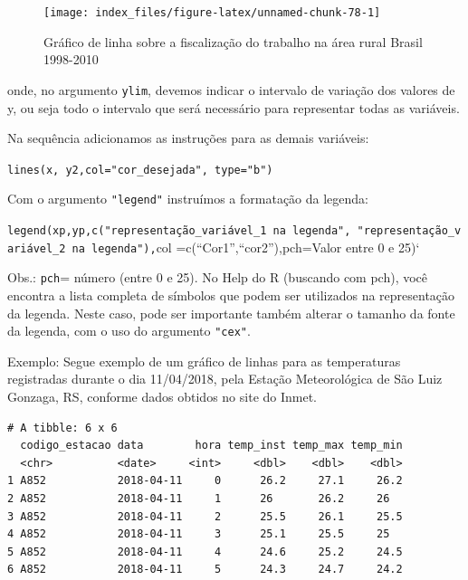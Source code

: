 \documentclass[12pt,brazil,oneside]{book}
\newenvironment{Shaded}{\begin{snugshade}}{\end{snugshade}}
\newcommand{\DataTypeTok}[1]{\textcolor[rgb]{0.13,0.29,0.53}{#1}}
\newcommand{\KeywordTok}[1]{\textcolor[rgb]{0.13,0.29,0.53}{\textbf{#1}}}
\newcommand{\NormalTok}[1]{#1}
\newcommand{\OtherTok}[1]{\textcolor[rgb]{0.56,0.35,0.01}{#1}}
\newcommand{\StringTok}[1]{\textcolor[rgb]{0.31,0.60,0.02}{#1}}
\begin{document}
\begin{figure}[H]

{\centering \texttt{[image: index\_files/figure-latex/unnamed-chunk-78-1]} 

}

\caption{Gráfico de linha sobre a fiscalização do trabalho na área rural Brasil 1998-2010}\label{fig:unnamed-chunk-78}
\end{figure}

onde, no argumento \texttt{ylim}, devemos indicar o intervalo de
variação dos valores de y, ou seja todo o intervalo que será necessário
para representar todas as variáveis.

Na sequência adicionamos as instruções para as demais variáveis:

\texttt{lines(x,\ y2,col="cor\_desejada",\ type="b")}

Com o argumento \texttt{"legend"} instruímos a formatação da legenda:

\texttt{legend(xp,yp,c("representação\_variável\_1\ na\ legenda",\ "representação\_variável\_2\ na\ legenda"),}col
=c(``Cor1'',``cor2''),pch=Valor entre 0 e 25)`

Obs.: \texttt{pch}= número (entre 0 e 25). No Help do R (buscando com
pch), você encontra a lista completa de símbolos que podem ser
utilizados na representação da legenda. Neste caso, pode ser importante
também alterar o tamanho da fonte da legenda, com o uso do argumento
\texttt{"cex"}.

Exemplo: Segue exemplo de um gráfico de linhas para as temperaturas
registradas durante o dia 11/04/2018, pela Estação Meteorológica de São
Luiz Gonzaga, RS, conforme dados obtidos no site do Inmet.

\begin{Shaded}
\end{Shaded}

\begin{verbatim}
# A tibble: 6 x 6
  codigo_estacao data        hora temp_inst temp_max temp_min
  <chr>          <date>     <int>     <dbl>    <dbl>    <dbl>
1 A852           2018-04-11     0      26.2     27.1     26.2
2 A852           2018-04-11     1      26       26.2     26  
3 A852           2018-04-11     2      25.5     26.1     25.5
4 A852           2018-04-11     3      25.1     25.5     25  
5 A852           2018-04-11     4      24.6     25.2     24.5
6 A852           2018-04-11     5      24.3     24.7     24.2
\end{verbatim}
\end{document}
